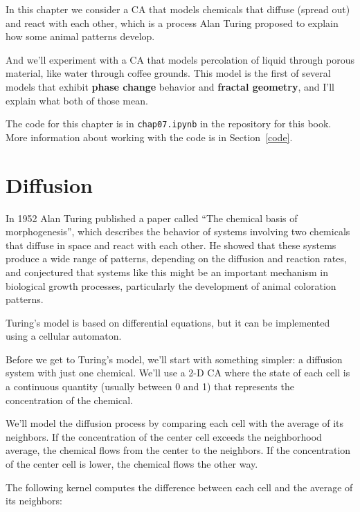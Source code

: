 \documentclass[12pt]{book}
\theoremstyle{exercise}
\begin{document}
In this chapter we consider a CA that models chemicals that diffuse (spread
out) and react with each other, which is a process Alan Turing proposed
to explain how some animal patterns develop.

And we'll experiment with a CA that models percolation of liquid
through porous material, like water through coffee grounds.  This
model is the first of several models that exhibit {\bf phase change}
behavior and {\bf fractal geometry}, and I'll explain what both of
those mean.


The code for this chapter is in {\tt chap07.ipynb} in the repository
for this book.  More information about working with the code is
in Section~\ref{code}.


\section{Diffusion}

In 1952 Alan Turing published a paper called ``The chemical basis
of morphogenesis'', which describes the behavior of systems involving
two chemicals that diffuse in space and react with each other.  He
showed that these systems produce a wide range of patterns, depending
on the diffusion and reaction rates, and conjectured that systems
like this might be an important mechanism in biological growth processes,
particularly the development of animal coloration patterns.


Turing's model is based on differential equations, but it can
be implemented using a cellular automaton.

Before we get to Turing's model, we'll start with something simpler:
a diffusion system with just one chemical.  We'll use a 2-D CA where the
state of each cell is a continuous quantity (usually between 0 and 1)
that represents the concentration of the chemical.


We'll model the diffusion process by comparing each cell with the
average of its neighbors.  If the concentration of the center cell
exceeds the neighborhood average, the chemical flows from the center
to the neighbors.  If the concentration of the center cell is lower,
the chemical flows the other way.


The following kernel computes the difference between each cell
and the average of its neighbors:
\end{document}
